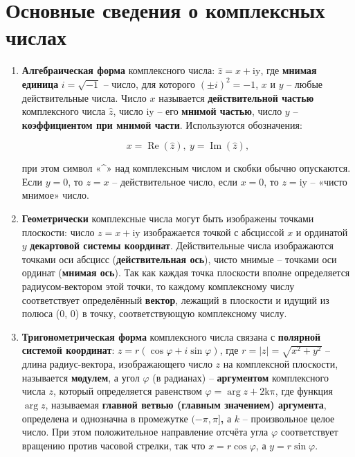 \section*{Основные сведения о комплексных числах}

\begin{enumerate}
\item
    \textbf{Алгебраическая форма} комплексного числа:
    $\hat{z} = x + \text{iy}$, где \textbf{мнимая единица}
    $i = \sqrt{- 1}$ -- число, для которого $( \pm i)^{2} = - 1$,
    $x$ и $y$ -- любые действительные числа. Число $x$ называется
    \textbf{действительной частью} комплексного числа $\hat{z}$,
    число $\text{iy}$ -- его \textbf{мнимой частью}, число $y$ --
    \textbf{коэффициентом при мнимой части}. Используются обозначения:
    
    \begin{equation*}        
        x = \operatorname{Re}(\hat{z}),~y = \operatorname{Im}(\hat{z}),
    \end{equation*}

    при этом символ «\^{}» над комплексным числом и скобки обычно
    опускаются. Если $y = 0$, то $z = x$ -- действительное число, если
    $x = 0$, то $z = \text{iy}$ -- «чисто мнимое» число.

\item
    \textbf{Геометрически} комплексные числа могут быть изображены точками
    плоскости: число $z = x + \text{iy}$ изображается точкой с абсциссой
    $x$ и ординатой $y$ \textbf{декартовой системы координат}.
    Действительные числа изображаются точками оси абсцисс
    (\textbf{действительная ось}), чисто мнимые -- точками оси ординат
    (\textbf{мнимая ось}). Так как каждая точка плоскости вполне
    определяется радиусом-вектором этой точки, то каждому комплексному
    числу соответствует определённый \textbf{вектор}, лежащий в плоскости
    и идущий из полюса (0, 0) в точку, соответствующую комплексному числу.

\item
    \textbf{Тригонометрическая форма} комплексного числа связана с
    \textbf{полярной системой координат}:
    $z = r(\cos\varphi + i\sin\varphi)$, где
    $r = \left| z \right| = \sqrt{x^{2} + y^{2}}$ -- длина
    радиус-вектора, изображающего число $z$ на комплексной плоскости,
    называется \textbf{модулем}, а угол $\varphi$ (в радианах) --
    \textbf{аргументом} комплексного числа $z$, который определяется
    равенством $\varphi = \arg z + 2\text{kπ}$,
    где функция $\arg z$, называемая \textbf{главной ветвью (главным
    значением) аргумента}, определена и однозначна в промежутке
    $( - \pi,\pi\rbrack$\textbf{,} а $k$ -- произвольное целое число.
    При этом {положительное направление отсчёта угла} $\varphi$
    {соответствует вращению против часовой стрелки}, так что
    $x = r\cos\varphi$, а $y = r\sin\varphi$.


\end{enumerate}
